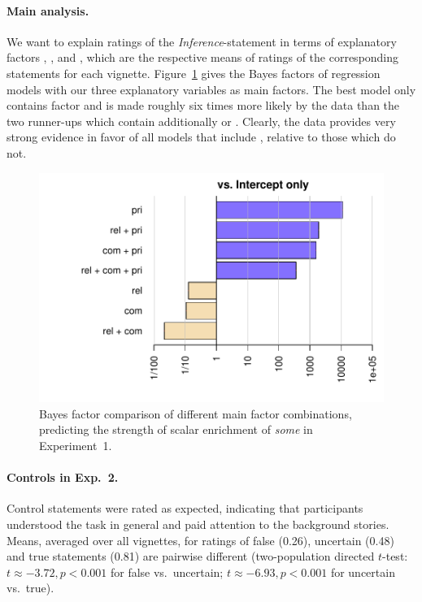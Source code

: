 \documentclass[12pt]{article}
\begin{document}
\paragraph{Main analysis.} We want to explain ratings of the \emph{Inference}-statement in
terms of explanatory factors \rel, \pri, and \com, which are the respective means of ratings of
the corresponding statements for each vignette. Figure~\ref{fig:BFsExp3} gives the Bayes
factors of regression models with our three explanatory variables as main factors. The best
model only contains factor \pri and is made roughly six times more likely by the data than the
two runner-ups which contain additionally \rel or \com. Clearly, the data provides very strong
evidence in favor of all models that include \pri, relative to those which do not.

\begin{figure}
  \centering
  \includegraphics[width = 0.8 \textwidth]{pics/bfsAllExp3.pdf}
  \caption{Bayes factor comparison of different main factor combinations, predicting the
    strength of scalar enrichment of \emph{some} in Experiment~1.}
  \label{fig:BFsExp3}
\end{figure}

\paragraph{Controls in Exp.\ 2.} Control statements were rated as expected, indicating that participants
understood the task in general and paid attention to the background stories. Means, averaged
over all vignettes, for ratings of false (0.26), uncertain (0.48) and true statements (0.81)
are pairwise different (two-population directed $t$-test: $t \approx - 3.72, p < 0.001$ for
false vs.~uncertain; $t \approx - 6.93, p < 0.001$ for uncertain vs.~true).

\end{document}
